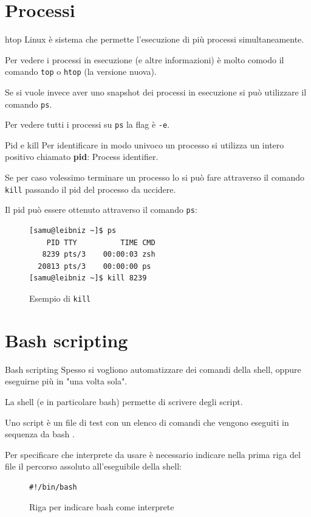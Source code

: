 \documentclass{beamer}
\begin{document}
\section{Processi}

\begin{frame}{htop}
  Linux è sistema che permette l'esecuzione di più processi simultaneamente. 
  \medskip

  Per vedere i processi in esecuzione (e altre informazioni) è molto comodo il 
  comando \texttt{top} o \texttt{htop} (la versione nuova). \medskip
  
  Se si vuole invece aver uno snapshot dei processi in esecuzione si può 
  utilizzare il comando \texttt{ps}. \medskip

  Per vedere tutti i processi su \texttt{ps} la flag è \texttt{-e}.
\end{frame}

\begin{frame}[fragile]{Pid e kill}
  Per identificare in modo univoco un processo si utilizza un intero positivo
  chiamato \textbf{pid}: Process identifier. \medskip \pause

  Se per caso volessimo terminare un processo lo si può fare attraverso il 
  comando \texttt{kill} passando il pid del processo da uccidere. \medskip

  Il pid può essere ottenuto attraverso il comando \texttt{ps}:
  \begin{figure}
    \begin{lstlisting}
[samu@leibniz ~]$ ps
    PID TTY          TIME CMD
   8239 pts/3    00:00:03 zsh
  20813 pts/3    00:00:00 ps
[samu@leibniz ~]$ kill 8239
    \end{lstlisting}
    \caption{Esempio di \texttt{kill}}
  \end{figure}
\end{frame}

\section{Bash scripting}

\begin{frame}[fragile]{Bash scripting}
  Spesso si vogliono automatizzare dei comandi della shell, oppure eseguirne più
  in "una volta sola". \medskip \pause

  La shell (e in particolare bash) permette di scrivere degli script. \medskip

  Uno script è un file di test con un elenco di comandi che vengono eseguiti in
  sequenza da bash
  .\medskip

  Per specificare che interprete da usare è necessario indicare nella prima riga
  del file il percorso assoluto all'eseguibile della shell: \smallskip

  \begin{figure}
    \begin{lstlisting}
#!/bin/bash
    \end{lstlisting}
    \caption{Riga per indicare bash come interprete}
  \end{figure}
\end{frame}
\end{document}
